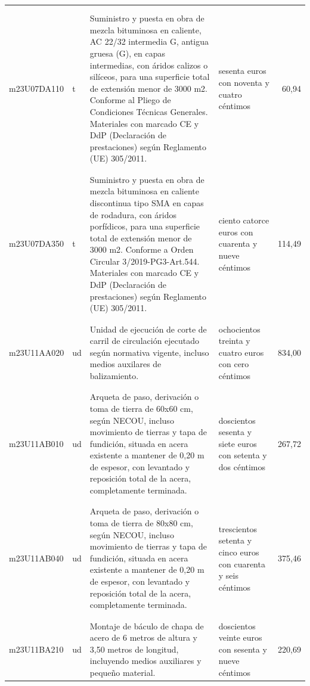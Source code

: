 \begin{supertabular}{|l|l|p{5cm}|p{3cm}|r|}
&&&&\\%
&&&&\\%
m23U07DA110&t&Suministro y puesta en obra de mezcla bituminosa en caliente, AC 22/32 intermedia G, antigua gruesa (G), en capas intermedias, con áridos calizos o silíceos, para una superficie total de extensión menor de 3000 m2. Conforme al Pliego de Condiciones Técnicas Generales. Materiales con marcado CE y DdP (Declaración de prestaciones) según Reglamento (UE) 305/2011.&sesenta euros con noventa y cuatro céntimos&60,94\\%
&&&&\\%
&&&&\\%
m23U07DA350&t&Suministro y puesta en obra de mezcla bituminosa en caliente discontinua tipo SMA en capas de rodadura, con áridos porfídicos, para una superficie total de extensión menor de 3000 m2. Conforme a Orden Circular 3/2019{-}PG3{-}Art.544. Materiales con marcado CE y DdP (Declaración de prestaciones) según Reglamento (UE) 305/2011.&ciento catorce euros con cuarenta y nueve céntimos&114,49\\%
&&&&\\%
&&&&\\%
m23U11AA020&ud&Unidad de ejecución de corte de carril de circulación ejecutado según normativa vigente, incluso medios auxilares de balizamiento.&ochocientos treinta y cuatro euros con cero céntimos&834,00\\%
&&&&\\%
&&&&\\%
m23U11AB010&ud&Arqueta de paso, derivación o toma de tierra de 60x60 cm, según NECOU, incluso movimiento de tierras y tapa de fundición, situada en acera existente a mantener de 0,20 m de espesor, con levantado y reposición total de la acera, completamente terminada.&doscientos sesenta y siete euros con setenta y dos céntimos&267,72\\%
&&&&\\%
&&&&\\%
m23U11AB040&ud&Arqueta de paso, derivación o toma de tierra de 80x80 cm, según NECOU, incluso movimiento de tierras y tapa de fundición, situada en acera existente a mantener de 0,20 m de espesor, con levantado y reposición total de la acera, completamente terminada.&trescientos setenta y cinco euros con cuarenta y seis céntimos&375,46\\%
&&&&\\%
&&&&\\%
m23U11BA210&ud&Montaje de báculo de chapa de acero de 6 metros de altura y 3,50 metros de longitud, incluyendo medios auxiliares y pequeño material.&doscientos veinte euros con sesenta y nueve céntimos&220,69\\%

\end{supertabular}
